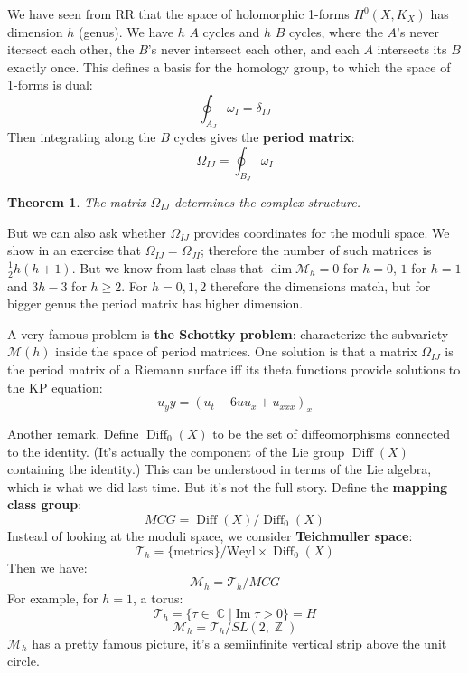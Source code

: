 \documentclass[12 pt]{article}
\DeclareMathOperator {\C} {\mathbb{C}}
\DeclareMathOperator {\Z} {\mathbb{Z}}
\DeclareMathOperator {\Imag}{Im}
\DeclareMathOperator {\Diff}{Diff}
\theoremstyle{plain}
\newtheorem*{thm*}{Theorem}
\theoremstyle{definition}
\theoremstyle{remark}
\begin{document}
We have seen from RR that the space of holomorphic 1-forms $H^0(X,K_X)$ has dimension $h$ (genus). We have $h$ $A$ cycles and $h$ $B$ cycles, where the $A$'s never itersect each other, the $B$'s never intersect each other, and each $A$ intersects its $B$ exactly once. This defines a basis for the homology group, to which the space of 1-forms is dual:
\[       \oint_{A_J} \omega_I = \delta_{IJ}     \]
Then integrating along the $B$ cycles gives the \textbf{period matrix}:
\[      \Omega_{IJ} = \oint_{B_J} \omega_I     \]
\begin{thm*}
The matrix $\Omega_{IJ}$ determines the complex structure.
\end{thm*}
But we can also ask whether $\Omega_{IJ}$ provides coordinates for the moduli space. We show in an exercise that $\Omega_{IJ} = \Omega_{JI}$; therefore the number of such matrices is $\frac{1}{2} h(h+1)$. But we know from last class that $\dim \mathcal{M}_h = 0$ for $h=0$, $1$ for $h=1$ and $3h-3$ for $h\geq 2$. For $h=0,1,2$ therefore the dimensions match, but for bigger genus the period matrix has higher dimension.

A very famous problem is \textbf{the Schottky problem}: characterize the subvariety $\mathcal{M}(h)$ inside the space of period matrices. One solution is that a matrix $\Omega_{IJ}$ is the period matrix of a Riemann surface iff its theta functions provide solutions to the KP equation:
\[       u_yy = (u_t - 6uu_x  + u_{xxx})_x      \]

Another remark. Define $\Diff_0(X)$ to be the set of diffeomorphisms connected to the identity. (It's actually the component of the Lie group $\Diff(X)$ containing the identity.) This can be understood in terms of the Lie algebra, which is what we did last time. But it's not the full story. Define the \textbf{mapping class group}:
\[      MCG = \Diff(X)/\Diff_0(X)     \]
Instead of looking at the moduli space, we consider \textbf{Teichmuller space}:
\[          \mathcal{T}_h = \{\text{metrics}\}/\text{Weyl} \times \Diff_0(X)        \]
Then we have:
\[       \mathcal{M}_h = \mathcal{T}_h/MCG    \]
For example, for $h=1$, a torus:
\[        \mathcal{T}_h = \{  \tau \in \C | \Imag \tau > 0  \}   = H     \]
\[        \mathcal{M}_h = \mathcal{T}_h / SL(2, \Z)     \]
$\mathcal{M}_h$ has a pretty famous picture, it's a semiinfinite vertical strip above the unit circle.
\end{document}
